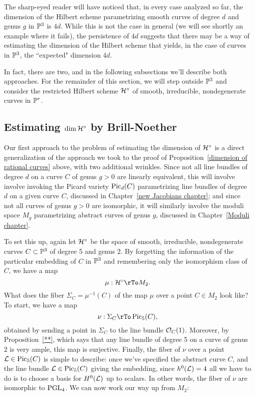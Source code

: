 The sharp-eyed reader will have noticed that, in every case analyzed so far, the dimension of the Hilbert scheme parametrizing smooth curves of degree $d$ and genus $g$ in $\PP^3$ is $4d$. While this is not the case in general (we will see shortly an example where it fails), the persistence of $4d$ suggests that there may be a way of estimating the dimension of the Hilbert scheme that yields, in the case of curves in $\PP^3$, the ``expected" dimension $4d$.

In fact, there are two, and in the following subsections we'll describe both approaches. For the remainder of this section, we will step outside $\PP^3$ and consider the restricted Hilbert scheme $\cH^\circ$ of smooth, irreducible, nondegenerate curves in $\PP^r$.

\subsection{Estimating $\dim \cH^\circ$ by Brill-Noether}

Our first approach to the problem of estimating the dimension of $\cH^\circ$ is a direct generalization of the approach we took to the proof of Proposition~\ref{dimension of rational curves} above, with two additional wrinkles. Since not all line bundles of degree $d$ on a curve $C$ of genus $g > 0$ are linearly equivalent, this will involve involve invoking the Picard variety $\Pic_d(C)$ parametrizing line bundles of degree $d$ on a given curve $C$, discussed in Chapter~\ref{new Jacobians chapter}; and since not all curves of genus $g > 0$ are isomorphic, it will similarly involve the moduli space  $M_g$ parametrizing abstract curves of genus $g$, discussed in Chapter~\ref{Moduli chapter}.

To set this up, again let $\cH^\circ$ be the space of smooth, irreducible, nondegenerate curves $C \subset \PP^3$ of degree 5 and genus 2. By forgetting the information of the particular embedding of $C$ in $\PP^3$ and remembering only the isomorphism class of $C$, we have a map
$$
\mu : \cH^\circ \rTo M_2.
$$
What does the fiber $\Sigma_C =\mu^{-1}(C)$ of the map $\mu$ over a point $C \in M_2$ look like? To start, we have a map
$$
\nu : \Sigma_C \rTo \Pic_5(C),
$$
obtained by sending a point in $\Sigma_C$ to the line bundle $\cO_C(1)$. Moreover, by Proposition~\ref{**}, which says that any line bundle of degree 5 on a curve of genus 2 is very ample, this map is surjective. Finally, the fiber of $\nu$ over a point $\cL \in \Pic_5(C)$ is simple to describe: once we've specified the abstract curve $C$, and the line bundle $\cL \in \Pic_5(C)$ giving the embedding, since $h^0(\cL) = 4$ all we have to do is to choose a basis for $H^0(\cL)$ up to scalars. In other words, the fiber of $\nu$ are isomorphic to $\PGL_4$. We can now work our way up from $M_2$:

